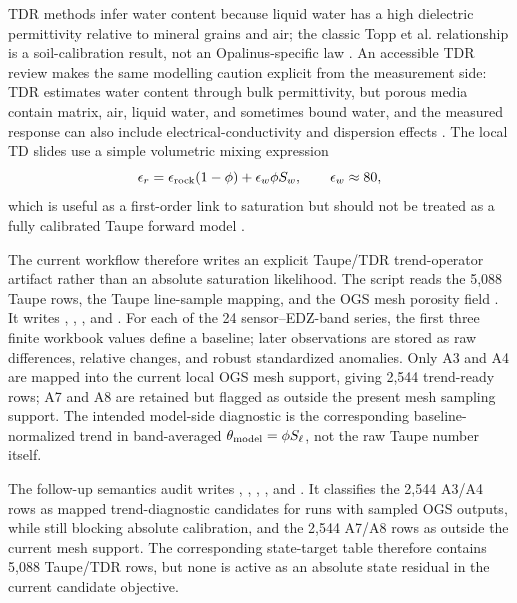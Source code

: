 TDR methods infer water content because liquid water has a high dielectric
permittivity relative to mineral grains and air; the classic Topp et al. relationship
is a soil-calibration result, not an Opalinus-specific law
\cite[pp.~574--577]{Topp1980TDR}.  An accessible TDR review makes the same modelling
caution explicit from the measurement side: TDR estimates water content through bulk
permittivity, but porous media contain matrix, air, liquid water, and sometimes
bound water, and the measured response can also include electrical-conductivity and
dispersion effects \cite[pp.~444--446]{Robinson2003TDRReview}.  The local TD slides
use a simple volumetric mixing
expression
\[
\epsilon_r=\epsilon_{\rm rock}(1-\phi)+\epsilon_w\phi S_w,
\qquad \epsilon_w\approx 80,
\]
which is useful as a first-order link to saturation but should not be treated as a
fully calibrated Taupe forward model \cite[PDF p.~8]{CDAModellingSlides2025}.

The current workflow therefore writes an explicit Taupe/TDR trend-operator artifact
rather than an absolute saturation likelihood.  The script
 reads the 5,088 Taupe rows, the Taupe
line-sample mapping, and the OGS mesh porosity field .  It writes
, ,
, and
.  For each of the 24 sensor--EDZ-band
series, the first three finite workbook values define a baseline; later observations
are stored as raw differences, relative changes, and robust standardized anomalies.
Only A3 and A4 are mapped into the current local OGS mesh support, giving 2,544
trend-ready rows; A7 and A8 are retained but flagged as outside the present mesh
sampling support.  The intended model-side diagnostic is the corresponding
baseline-normalized trend in band-averaged
\(\theta_{\rm model}=\phi S_\ell\), not the raw Taupe number itself.

The follow-up semantics audit  writes
,
,
,
, and .  It
classifies the 2,544 A3/A4 rows as mapped trend-diagnostic candidates for runs with
sampled OGS outputs, while still blocking absolute calibration, and the 2,544 A7/A8
rows as outside the current mesh support.
The corresponding state-target table therefore contains 5,088 Taupe/TDR rows, but
none is active as an absolute state residual in the current candidate objective.

